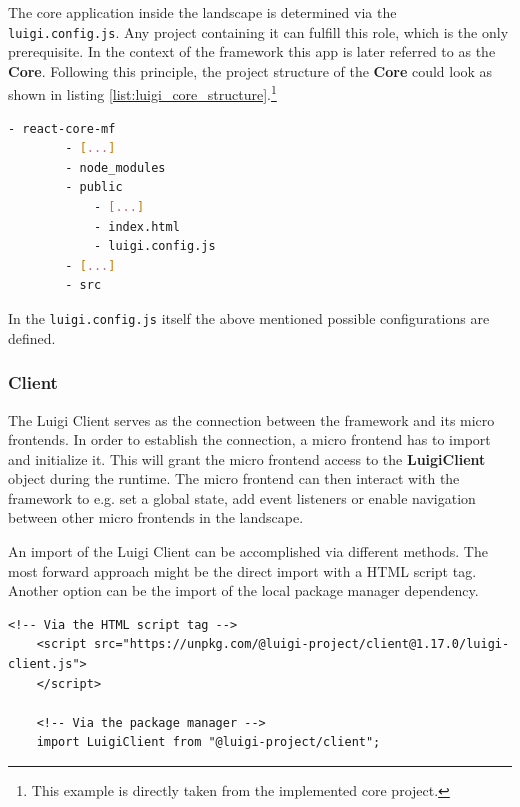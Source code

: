 The core application inside the landscape is determined via the \texttt{luigi.config.js}. Any project containing it can fulfill this role, which is the only prerequisite. In the context of the framework this app is later referred to as the \textbf{Core}.
Following this principle, the project structure of the \textbf{Core} could look as shown in listing \ref{list:luigi_core_structure}.\footnote{This example is directly taken from the implemented core project.}  

\begin{lstlisting}[language=Bash, caption=Project structure for a Luigi Core application including the \texttt{luigi.config.js}, label=list:luigi_core_structure,  xleftmargin=.01\textwidth, xrightmargin=.01\textwidth]
	- react-core-mf
		- [...]
		- node_modules
		- public
			- [...]
			- index.html
			- luigi.config.js
		- [...]
		- src
\end{lstlisting}

In the \texttt{luigi.config.js} itself the above mentioned possible configurations are defined.\cite{luigi_doc_core}

\subsubsection{Client}

The Luigi Client serves as the connection between the framework and its micro frontends. In order to establish the connection, a micro frontend has to import and initialize it. This will grant the micro frontend access to the \textbf{LuigiClient} object during the runtime. The micro frontend can then interact with the framework to e.g. set a global state, add event listeners or enable navigation between other micro frontends in the landscape.

An import of the Luigi Client can be accomplished via different methods. The most forward approach might be the direct import with a HTML script tag. Another option can be the import of the local package manager dependency.\cite{luigi_client}

\begin{lstlisting}[caption=Import methods of the Luigi Client, label=list:import_luigi_client,  xleftmargin=.01\textwidth, xrightmargin=.01\textwidth]
	<!-- Via the HTML script tag -->
	<script src="https://unpkg.com/@luigi-project/client@1.17.0/luigi-client.js">
	</script>
	
	<!-- Via the package manager -->
	import LuigiClient from "@luigi-project/client";
\end{lstlisting}

